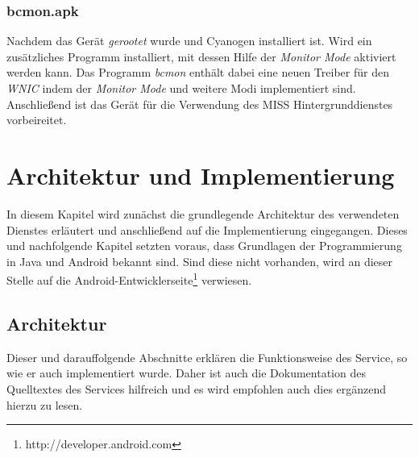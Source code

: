\documentclass[]{report}
\begin{document}
\subsection{bcmon.apk}
Nachdem das Gerät \textit{gerootet} wurde und Cyanogen installiert ist. Wird ein zusätzliches Programm installiert, mit dessen Hilfe der \textit{Monitor Mode} aktiviert werden kann. Das Programm \textit{bcmon} enthält dabei eine neuen Treiber für den \textit{WNIC} indem der \textit{Monitor Mode} und weitere Modi implementiert sind. Anschließend ist das Gerät für die Verwendung des MISS Hintergrunddienstes vorbeireitet. 
\chapter{Architektur und Implementierung}
In diesem Kapitel wird zunächst die grundlegende Architektur des verwendeten Dienstes erläutert und anschließend auf die Implementierung eingegangen. Dieses und nachfolgende Kapitel setzten voraus, dass Grundlagen der Programmierung in Java und Android bekannt sind. Sind diese nicht vorhanden, wird an dieser Stelle auf die Android-Entwicklerseite\footnote{http://developer.android.com} verwiesen. 
\section{Architektur}
Dieser und darauffolgende Abschnitte erklären die Funktionsweise des Service, so wie er auch implementiert wurde. Daher ist auch die Dokumentation des Quelltextes des Services hilfreich und es wird empfohlen auch dies ergänzend hierzu zu lesen. 
\end{document}
